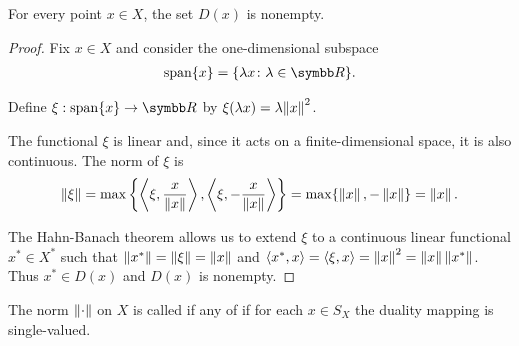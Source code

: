 \begin{lemma}\label{thm:nonempty_banach_duality_mapping}
  For every point \( x \in X \), the set \( D(x) \) is nonempty.
\end{lemma}
\begin{proof}
  Fix \( x \in X \) and consider the one-dimensional subspace
  \begin{align*}
    \Span \{ x \}
    =
    \{ \lambda x \colon \lambda \in \R \}.
  \end{align*}

  Define \( \xi: \Span \{ x \} \to \R \) by \( \xi(\lambda x) = \lambda {\left\Vert x \right\Vert}^2 \).

  The functional \( \xi \) is linear and, since it acts on a finite-dimensional space, it is also continuous. The norm of \( \xi \) is
  \begin{equation*}
    \left\Vert \xi \right\Vert = \max \left\{ \left\langle \xi, \frac x {\left\Vert x \right\Vert} \right\rangle, \left\langle \xi, -\frac x {\left\Vert x \right\Vert} \right\rangle \right\} = \max \{ \left\Vert x \right\Vert, -\left\Vert x \right\Vert \} = \left\Vert x \right\Vert.
  \end{equation*}

  The Hahn-Banach theorem allows us to extend \( \xi \) to a continuous linear functional \( x^* \in X^* \) such that \( \left\Vert x^* \right\Vert = \left\Vert \xi \right\Vert = \left\Vert x \right\Vert \) and \( \left\langle x^*, x \right\rangle = \left\langle \xi, x \right\rangle = \left\Vert x \right\Vert^2 = \left\Vert x \right\Vert \left\Vert x^* \right\Vert \). Thus \( x^* \in D(x) \) and \( D(x) \) is nonempty.
\end{proof}

\begin{definition}\label{def:smooth_norm}\cite[definition 2.36]{Phelps1993}
  The norm \( \left\Vert \cdot \right\Vert \) on \( X \) is called  if any of  if for each \( x \in S_X \) the duality mapping is single-valued.
\end{definition}


